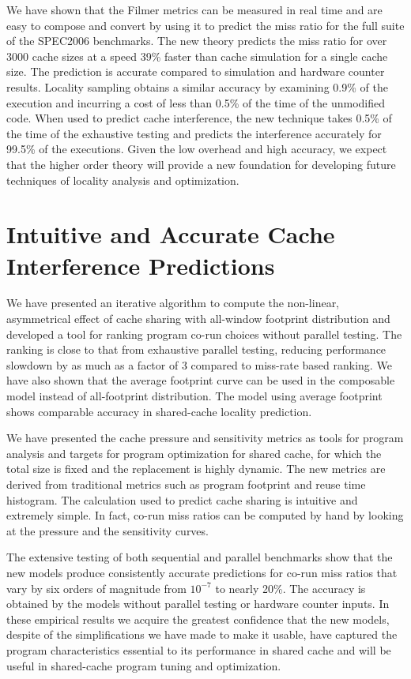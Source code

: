 \documentclass[12pt]{report}
\begin{document}
We have shown that the Filmer metrics can be measured in real time and
are easy to compose and convert by using it to predict the miss ratio
for the full suite of the SPEC2006 benchmarks. The new theory
predicts the miss ratio for over 3000 cache sizes at a
speed 39\% faster than cache simulation for a single cache size.  The
prediction is accurate compared to simulation and hardware counter
results.  Locality sampling obtains a similar accuracy by
examining 0.9\% of the execution and incurring a cost of less than
0.5\% of the time of the unmodified code.  When used to predict cache
interference, the new technique takes 0.5\% of the time of the
exhaustive testing and predicts the interference accurately for 99.5\%
of the executions. Given the low overhead and high accuracy, we expect that
the higher order theory will provide a new
foundation for developing future techniques of locality analysis and
optimization. 

\section{Intuitive and Accurate Cache Interference Predictions} 

We have presented an iterative algorithm to compute the
non-linear, asymmetrical effect of cache sharing with all-window
footprint distribution and developed a tool
for ranking program co-run choices without parallel testing.  The
ranking is close to that from exhaustive parallel testing, reducing
performance slowdown by as much as a factor of 3 compared to miss-rate
based ranking. We have also shown that the average footprint curve can
be used in the composable model instead of all-footprint
distribution. The model using average footprint shows comparable
accuracy in shared-cache locality prediction.  

We have presented the cache pressure and sensitivity metrics as tools
for program analysis and targets for program optimization for shared
cache, for which the total size is fixed and the replacement is highly
dynamic.  The new metrics are derived from traditional metrics such as
program footprint and reuse time histogram. The calculation used to
predict cache sharing is intuitive and extremely simple.  In fact,
co-run miss ratios can be computed by hand by looking at the pressure
and the sensitivity curves. 

The extensive testing of both sequential and parallel benchmarks show
that the new models produce consistently accurate predictions for
co-run miss ratios that vary by six orders of magnitude from $10^{-7}$
to nearly 20\%.  The accuracy is obtained by the models without
parallel testing or hardware counter inputs.  In these empirical
results we acquire the greatest confidence that the new models,
despite of the simplifications we have made to make it usable, have
captured the program characteristics essential to its performance in
shared cache and will be useful in shared-cache program tuning and
optimization.
\end{document}
